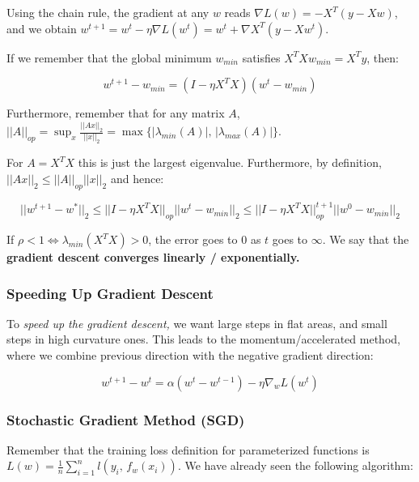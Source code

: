 \documentclass[a4paper]{extarticle}
\begin{document}
Using the chain rule, the gradient at any \(w\) reads \(\nabla L(w) = -X^T(y - Xw)\), and we obtain \(w^{t+1} = w^t - \eta \nabla L(w^t) = w^t + \nabla X^T (y - Xw^t)\).

If we remember that the global minimum \(w_{min}\) satisfies \(X^TXw_{min} = X^Ty\), then:

\begin{tbox}
    \[
        w^{t+1} - w_{min} = (I - \eta X^TX)(w^t - w_{min})
    \]
\end{tbox}

Furthermore, remember that for any matrix \(A\), \(||A||_{op} = \sup_x \frac{||Ax||_2}{||x||_2} = \max \{|\lambda_{min}(A)|, \, |\lambda_{max}(A)|\}\).

For \(A = X^TX\) this is just the largest eigenvalue. Furthermore, by definition, \(||Ax||_2 \leq ||A||_{op}||x||_2\) and hence:

\begin{tbox}
    \[
        ||w^{t + 1} - w^*||_2 \leq ||I - \eta X^TX||_{op}||w^t - w_{min}||_2 \leq ||I - \eta X^TX||_{op}^{t +1} ||w^0 - w_{min}||_2
    \]
\end{tbox}

If \(\rho < 1 \Leftrightarrow \lambda_{min}(X^TX) > 0\), the error goes to  \(0\) as \(t\) goes to \(\infty\). We say that the \textbf{gradient descent converges linearly / exponentially.}

\subsubsection{Speeding Up Gradient Descent}

To \textit{speed up the gradient descent,} we want large steps in flat areas, and small steps in high curvature ones. This leads to the momentum/accelerated method, where we combine previous direction with the negative gradient direction:

\[
    w^{t+1} - w^t = \alpha (w^t - w^{t-1}) - \eta \nabla_w L(w^t)
\]

\subsubsection{Stochastic Gradient Method (SGD)}

Remember that the training loss definition for parameterized functions is \(L(w) = \frac{1}{n} \sum_{i = 1}^n l(y_i, \, f_w(x_i))\). We have already seen the following algorithm:
\end{document}
